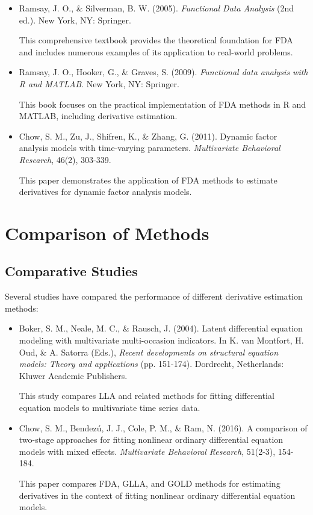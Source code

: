 \documentclass{article}
\begin{document}
\begin{itemize}
    \item Ramsay, J. O., \& Silverman, B. W. (2005). \textit{Functional Data Analysis} (2nd ed.). New York, NY: Springer.
    
    This comprehensive textbook provides the theoretical foundation for FDA and includes numerous examples of its application to real-world problems.
    
    \item Ramsay, J. O., Hooker, G., \& Graves, S. (2009). \textit{Functional data analysis with R and MATLAB}. New York, NY: Springer.
    
    This book focuses on the practical implementation of FDA methods in R and MATLAB, including derivative estimation.
    
    \item Chow, S. M., Zu, J., Shifren, K., \& Zhang, G. (2011). Dynamic factor analysis models with time-varying parameters. \textit{Multivariate Behavioral Research}, 46(2), 303-339.
    
    This paper demonstrates the application of FDA methods to estimate derivatives for dynamic factor analysis models.
\end{itemize}

\section{Comparison of Methods}

\subsection{Comparative Studies}

Several studies have compared the performance of different derivative estimation methods:

\begin{itemize}
    \item Boker, S. M., Neale, M. C., \& Rausch, J. (2004). Latent differential equation modeling with multivariate multi-occasion indicators. In K. van Montfort, H. Oud, \& A. Satorra (Eds.), \textit{Recent developments on structural equation models: Theory and applications} (pp. 151-174). Dordrecht, Netherlands: Kluwer Academic Publishers.
    
    This study compares LLA and related methods for fitting differential equation models to multivariate time series data.
    
    \item Chow, S. M., Bendezú, J. J., Cole, P. M., \& Ram, N. (2016). A comparison of two-stage approaches for fitting nonlinear ordinary differential equation models with mixed effects. \textit{Multivariate Behavioral Research}, 51(2-3), 154-184.
    
    This paper compares FDA, GLLA, and GOLD methods for estimating derivatives in the context of fitting nonlinear ordinary differential equation models.
\end{itemize}
\end{document}
